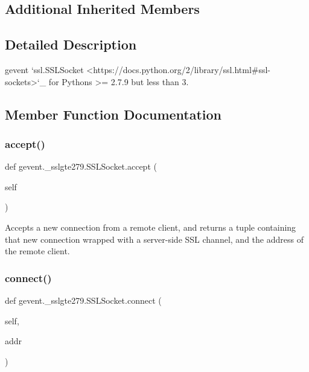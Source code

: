 \subsection*{Additional Inherited Members}


\subsection{Detailed Description}
\begin{DoxyVerb}gevent `ssl.SSLSocket <https://docs.python.org/2/library/ssl.html#ssl-sockets>`_
for Pythons >= 2.7.9 but less than 3.
\end{DoxyVerb}
 

\subsection{Member Function Documentation}
\mbox{\label{classgevent_1_1__sslgte279_1_1_s_s_l_socket_ac178f1d3d472f4e3bf23788098986eb5}} 
\subsubsection{\texorpdfstring{accept()}{accept()}}
{\footnotesize\ttfamily def gevent.\+\_\+sslgte279.\+S\+S\+L\+Socket.\+accept (\begin{DoxyParamCaption}\item[{}]{self }\end{DoxyParamCaption})}

\begin{DoxyVerb}Accepts a new connection from a remote client, and returns
a tuple containing that new connection wrapped with a server-side
SSL channel, and the address of the remote client.\end{DoxyVerb}
 \mbox{\label{classgevent_1_1__sslgte279_1_1_s_s_l_socket_a5bcf1de76a98dc749f0513434942aeac}} 
\subsubsection{\texorpdfstring{connect()}{connect()}}
{\footnotesize\ttfamily def gevent.\+\_\+sslgte279.\+S\+S\+L\+Socket.\+connect (\begin{DoxyParamCaption}\item[{}]{self,  }\item[{}]{addr }\end{DoxyParamCaption})}

